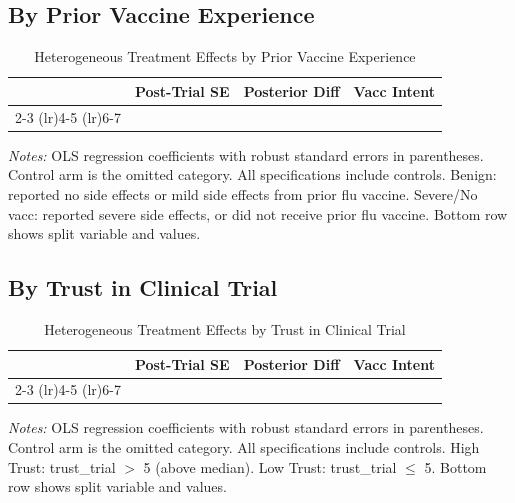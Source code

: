 \documentclass[11pt]{article}
\begin{document}
\subsection{By Prior Vaccine Experience}

\begin{table}[H]
\caption{Heterogeneous Treatment Effects by Prior Vaccine Experience}
\label{tab:het_bad_experience}
\centering
\begin{tabular}{lcccccc}
\toprule
& \multicolumn{2}{c}{Post-Trial SE} & \multicolumn{2}{c}{Posterior Diff} & \multicolumn{2}{c}{Vacc Intent} \\
\cmidrule(lr){2-3} \cmidrule(lr){4-5} \cmidrule(lr){6-7}

\\
\bottomrule
\end{tabular}
\begin{minipage}{\textwidth}
\vspace{0.5em}
\footnotesize
\textit{Notes:} OLS regression coefficients with robust standard errors in parentheses. Control arm is the omitted category. All specifications include controls. Benign: reported no side effects or mild side effects from prior flu vaccine. Severe/No vacc: reported severe side effects, or did not receive prior flu vaccine. Bottom row shows split variable and values.
\end{minipage}
\end{table}

\subsection{By Trust in Clinical Trial}

\begin{table}[H]
\caption{Heterogeneous Treatment Effects by Trust in Clinical Trial}
\label{tab:het_high_trust}
\centering
\begin{tabular}{lcccccc}
\toprule
& \multicolumn{2}{c}{Post-Trial SE} & \multicolumn{2}{c}{Posterior Diff} & \multicolumn{2}{c}{Vacc Intent} \\
\cmidrule(lr){2-3} \cmidrule(lr){4-5} \cmidrule(lr){6-7}

\\
\bottomrule
\end{tabular}
\begin{minipage}{\textwidth}
\vspace{0.5em}
\footnotesize
\textit{Notes:} OLS regression coefficients with robust standard errors in parentheses. Control arm is the omitted category. All specifications include controls. High Trust: trust\_trial $>$ 5 (above median). Low Trust: trust\_trial $\leq$ 5. Bottom row shows split variable and values.
\end{minipage}
\end{table}
\end{document}
